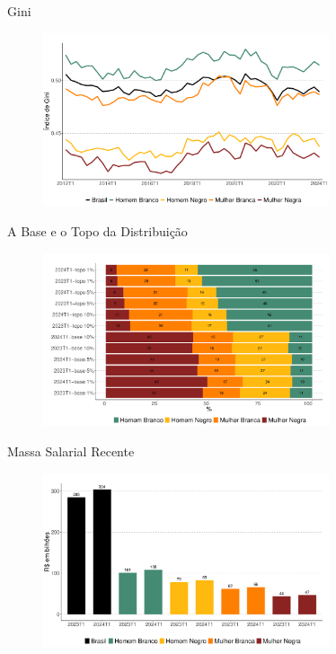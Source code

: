 \documentclass[10pt, xcolor=x11names,compress]{beamer}
\begin{document}
	
	\begin{frame}{Gini}
		\begin{figure}
			\centering
			\includegraphics[width = 0.75\textwidth]{figures_output/gini_br_gen_raca.pdf}
		\end{figure}
	\end{frame}
	
	\begin{frame}{A Base e o Topo da Distribuição}
	\begin{figure}
		\centering
		\includegraphics[width = 0.75\textwidth]{figures_output/top_bottom.pdf}
	\end{figure}
	\end{frame}
	
	\begin{frame}{Massa Salarial Recente}
	\begin{figure}
		\centering
		\includegraphics[width = 0.75\textwidth]{figures_output/massa_habitual.pdf}
	\end{figure}
	\end{frame}
	
\end{document}
